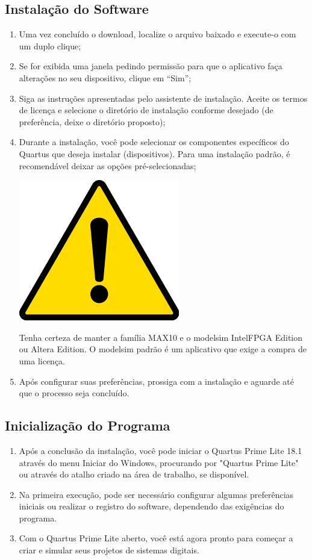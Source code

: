 \documentclass[12pt,a4paper]{article}
\newcommand{\Version}{18.1}
\newcommand{\Attention}[1]{
    \begin{tcolorbox}[colback=red!5!white, colframe=red!75!black]
        \noindent
        \begin{minipage}[c]{1cm}%
            \includegraphics[width=\linewidth]{figs/attention.png}
        \end{minipage}%
        \hfill%
        \begin{minipage}[c]{\dimexpr\linewidth-1cm-2mm}%
            \begin{center}
                #1    
            \end{center}            
        \end{minipage}
    \end{tcolorbox}
}
\begin{document}
\subsection{Instalação do Software}

\begin{enumerate}
    \item Uma vez concluído o download, localize o arquivo baixado e execute-o com um duplo clique;
    \item Se for exibida uma janela pedindo permissão para que o aplicativo faça alterações no seu dispositivo, clique em ``Sim'';
    \item Siga as instruções apresentadas pelo assistente de instalação. Aceite os termos de licença e selecione o diretório de instalação conforme desejado (de preferência, deixe o diretório proposto);
    \item Durante a instalação, você pode selecionar os componentes específicos do Quartus que deseja instalar (dispositivos). Para uma instalação padrão, é recomendável deixar as opções pré-selecionadas;
    
    \Attention{Tenha certeza de manter a família MAX10 e o modelsim IntelFPGA Edition ou Altera Edition. O modelsim padrão é um aplicativo que exige a compra de uma licença.}

    \item Após configurar suas preferências, prossiga com a instalação e aguarde até que o processo seja concluído. %
\end{enumerate}

\subsection{Inicialização do Programa}

\begin{enumerate}
    \item Após a conclusão da instalação, você pode iniciar o Quartus Prime Lite \Version{} através do menu Iniciar do Windows, procurando por "Quartus Prime Lite" ou através do atalho criado na área de trabalho, se disponível.
    \item Na primeira execução, pode ser necessário configurar algumas preferências iniciais ou realizar o registro do software, dependendo das exigências do programa.
    \item Com o Quartus Prime Lite aberto, você está agora pronto para começar a criar e simular seus projetos de sistemas digitais.
\end{enumerate}
\end{document}
